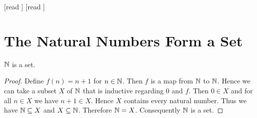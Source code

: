 \documentclass[10pt]{article}
\begin{document}
  \begin{imports}
    \begin{forthel}
      [read ]
      [read ]
    \end{forthel}
  \end{imports}


  \section*{The Natural Numbers Form a Set}

  \begin{forthel}
    \begin{proposition}[id=ARITHMETIC_07_4685510236547454,printid]
      $\mathbb{N}$ is a set.
    \end{proposition}
    \begin{proof}
      Define $f(n) = n + 1$ for $n \in \mathbb{N}$.
      Then $f$ is a map from $\mathbb{N}$ to $\mathbb{N}$.
      Hence we can take a subset $X$ of $\mathbb{N}$ that is inductive regarding
      $0$ and $f$.
      Then $0 \in X$ and for all $n \in X$ we have $n + 1 \in X$.
      Hence $X$ contains every natural number.
      Thus we have $\mathbb{N} \subseteq X$ and $X \subseteq \mathbb{N}$.
      Therefore $\mathbb{N} = X$.
      Consequently $\mathbb{N}$ is a set.
    \end{proof}
  \end{forthel}
\end{document}
